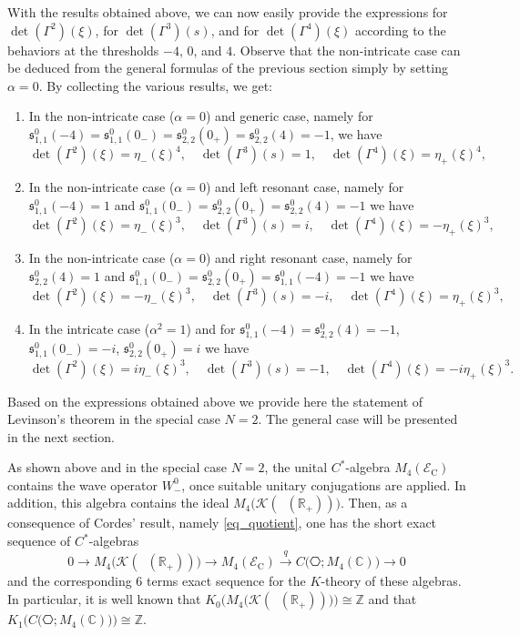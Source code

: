 \documentclass[11pt]{article}
\def\C{\mathbb C}
\def\EEC{\mathscr E_{\mathrm C}}
\def\K{\mathscr K}
\def\R{\mathbb R}
\def\s{\mathfrak s}
\def\Z{\mathbb Z}
\def\ltwo{\mathop{\mathrm{L}^2}\nolimits}
\begin{document}
With the results obtained above, we can now easily provide the expressions for $\det(\Gamma^2)(\xi)$, for 
$\det(\Gamma^3)(s)$, and for $\det(\Gamma^4)(\xi)$ according to the behaviors at the thresholds
$-4$, $0$, and $4$. Observe that the non-intricate case can be deduced from the general formulas of the previous section simply by setting $\alpha =0$. By collecting the various results, we get:
\begin{enumerate}
\item[$(i)$] 
In the non-intricate case ($\alpha=0$) and generic case, namely for $\s^0_{1,1}(-4)=\s^0_{1,1}(0_-)=\s^0_{2,2}(0_+)=\s^0_{2,2}(4)=-1$, we have
$$ 
\det (\Gamma^2)(\xi)=\eta_-(\xi)^4, \quad \det(\Gamma^3)(s)=1, \quad\det (\Gamma^4)(\xi)=\eta_+(\xi)^4,
$$
\item[$(ii)$] In the non-intricate case ($\alpha=0$) and left resonant case, namely for $\s^0_{1,1}(-4)=1$ and $\s^0_{1,1}(0_-)=\s^0_{2,2}(0_+)=\s^0_{2,2}(4)=-1$ we have
$$
\det (\Gamma^2)(\xi)=\eta_-(\xi)^3, \quad \det(\Gamma^3)(s)=i, \quad \det (\Gamma^4)(\xi)=-\eta_+(\xi)^3,
$$
\item[$(iii)$]
In the non-intricate case ($\alpha=0$) and right resonant case, namely for $\s^0_{2,2}(4)=1$ and $\s^0_{1,1}(0_-)=\s^0_{2,2}(0_+)=\s^0_{1,1}(-4)=-1$ we have
$$
\det (\Gamma^2)(\xi)=-\eta_-(\xi)^3, \quad \det(\Gamma^3)(s)=-i, \quad \det (\Gamma^4)(\xi)=\eta_+(\xi)^3,
$$
\item[$(iv)$]
In the intricate case ($\alpha^2=1$) and for $\s^0_{1,1}(-4)=\s^0_{2,2}(4)=-1$, $\s^0_{1,1}(0_-)=-i$, $\s^0_{2,2}(0_+)=i$ we have
$$
\det (\Gamma^2)(\xi)=i\eta_-(\xi)^3, \quad \det(\Gamma^3)(s)=-1, \quad \det (\Gamma^4)(\xi)=-i\eta_+(\xi)^3.
$$
\end{enumerate}

Based on the expressions obtained above
we provide here the statement of Levinson's theorem in the 
special case $N=2$. The general case will be presented in the next section.

As shown above and in the special case $N=2$,  the unital $C^*$-algebra  
$M_4(\EEC)$ contains the wave operator $W_-^0$, once suitable unitary conjugations are applied.
In addition, this algebra contains the ideal $M_4\big(\K(\ltwo(\R_+))\big)$.
Then, as a consequence of Cordes' result, namely \eqref{eq_quotient}, one has the short exact sequence of $C^*$-algebras
$$
0 \longrightarrow M_4\big(\K(\ltwo(\R_+))\big) \longrightarrow
M_4(\EEC) \stackrel{q}{\longrightarrow} 
C\big(\hexagon; M_4(\C)\big) \longrightarrow 0
$$
and the corresponding $6$ terms exact sequence for the $K$-theory of these algebras.
In particular, it is well known that $K_0\big(M_4\big(\K(\ltwo(\R_+))\big)\big)\cong\Z$
and that $K_1\big(C\big(\hexagon; M_4(\C)\big)\big)\cong\Z$.
\end{document}
